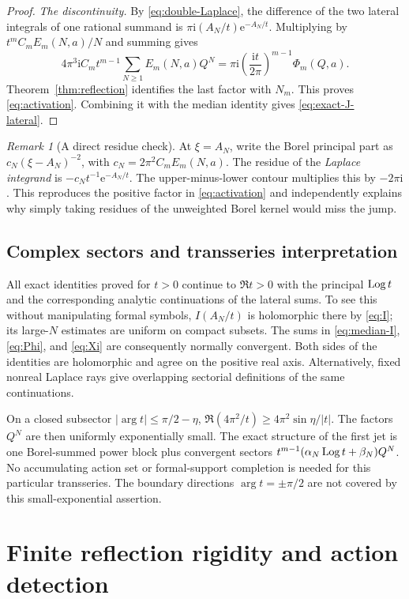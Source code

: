 \documentclass[11pt,a4paper]{article}
\numberwithin{equation}{section}
\theoremstyle{definition}\newtheorem{definition}[theorem]{Definition}
\theoremstyle{remark}\newtheorem{remark}[theorem]{Remark}
\newcommand{\ii}{\mathrm i}\newcommand{\e}{\mathrm e}
\begin{document}
\begin{proof}
\emph{The discontinuity.}
By \eqref{eq:double-Laplace}, the difference of the two lateral
integrals of one rational summand is
$\pi\ii(A_N/t)\e^{-A_N/t}$. Multiplying by
$t^mC_mE_m(N,a)/N$ and summing gives
\[
 4\pi^3\ii C_m t^{m-1}\sum_{N\ge1}E_m(N,a)Q^N
 =\pi\ii\left(\frac{\ii t}{2\pi}\right)^{m-1}\Phi_m(Q,a).
\]
Theorem~\ref{thm:reflection} identifies the last factor with $N_m$.
This proves \eqref{eq:activation}. Combining it with the median identity
gives \eqref{eq:exact-J-lateral}.
\end{proof}

\begin{remark}[A direct residue check]
At $\xi=A_N$, write the Borel principal part as
$c_N(\xi-A_N)^{-2}$, with $c_N=2\pi^2C_mE_m(N,a)$.
The residue of the \emph{Laplace integrand} is
$-c_Nt^{-1}\e^{-A_N/t}$. The upper-minus-lower contour multiplies this
by $-2\pi\ii$. This reproduces the positive factor in
\eqref{eq:activation} and independently explains why simply taking
residues of the unweighted Borel kernel would miss the jump.
\end{remark}

\subsection{Complex sectors and transseries interpretation}
All exact identities proved for $t>0$ continue to $\Re t>0$ with the
principal $\operatorname{Log} t$ and the corresponding analytic continuations of the
lateral sums. To see this without manipulating formal symbols,
$I(A_N/t)$ is holomorphic there by \eqref{eq:I}; its large-$N$
estimates are uniform on compact subsets. The sums in
\eqref{eq:median-I}, \eqref{eq:Phi}, and \eqref{eq:Xi} are consequently
normally convergent. Both sides of the identities are holomorphic and
agree on the positive real axis. Alternatively, fixed nonreal Laplace
rays give overlapping sectorial definitions of the same continuations.

On a closed subsector $|\arg t|\le\pi/2-\eta$,
$\Re(4\pi^2/t)\ge4\pi^2\sin\eta/|t|$. The factors $Q^N$ are then
uniformly exponentially small. The exact structure of the first jet is
one Borel-summed power block plus convergent sectors
$t^{m-1}(\alpha_N\operatorname{Log} t+\beta_N)Q^N$.
No accumulating action set or formal-support completion is needed for
this particular transseries. The boundary directions $\arg t=\pm\pi/2$
are not covered by this small-exponential assertion.

\section{Finite reflection rigidity and action detection}
\label{sec:atomic}
\end{document}
